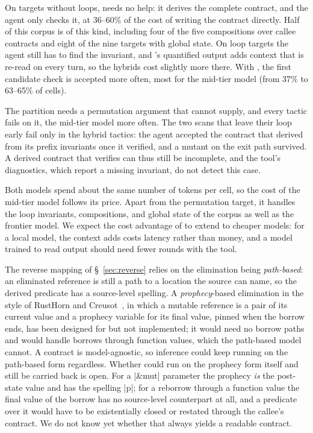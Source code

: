 \label{sec:discussion}

On targets without loops, \WP needs no help: it derives the complete contract, and the
agent only checks it, at 36--60\% of the cost of writing the contract directly. Half of
this corpus is of this kind, including four of the five compositions over callee
contracts and eight of the nine targets with global state. On loop targets the agent still has to find the
invariant, and \WP's quantified output adds context that is re-read on every turn, so
the hybrids cost slightly more there. With \WP, the first candidate check is accepted more
often, most for the mid-tier model (from 37\% to 63--65\% of cells).

The partition needs a permutation argument that \WP cannot supply, and every tactic fails
on it, the mid-tier model more often. The two scans that leave their loop early fail only
in the hybrid tactics: the agent accepted the contract that \WP derived from its prefix
invariants once it verified, and a mutant on the exit path survived. A derived contract
that verifies can thus still be incomplete, and the tool's diagnostics, which report a
missing invariant, do not detect this case.

Both models spend about the same number of tokens per cell, so the cost of the mid-tier
model follows its price. Apart from the permutation target, it handles the loop
invariants, compositions, and global state of the corpus as well as the frontier model.
We expect the cost advantage of \WP to extend to cheaper models: for a local model, the
context \WP adds costs latency rather than money, and a model trained to read \WP output
should need fewer rounds with the tool.

The reverse mapping of \S~\ref{sec:reverse} relies on the elimination being
\emph{path-based}: an eliminated reference is still a path to a location the source can
name, so the derived predicate has a source-level spelling. A \emph{prophecy}-based
elimination in the style of RustHorn and Creusot~\cite{RustHorn,Creusot22}, in which a mutable
reference is a pair of its current value and a prophecy variable for its final value,
pinned when the borrow ends, has been designed for \MVP but not implemented; it would
need no borrow paths and would handle borrows through function values, which the
path-based model cannot. A contract is model-agnostic, so inference could keep running
on the path-based form regardless. Whether \WP could run on the prophecy form itself
and still be carried back is open. For a |&mut| parameter the prophecy \emph{is} the
post-state value and has the spelling |p|; for a reborrow through a function value the
final value of the borrow has no source-level counterpart at all, and a predicate over it
would have to be existentially closed or restated through the callee's contract. We do
not know yet whether that always yields a readable contract.

